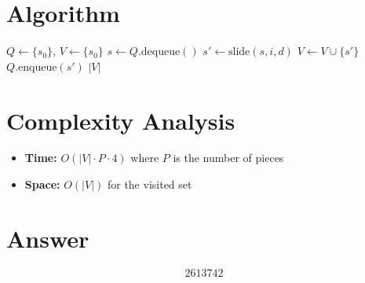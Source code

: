 \documentclass[12pt]{article}
\begin{document}
\section{Algorithm}
\begin{algorithm}[H]
\caption{BFS for Reachable Configurations}
\begin{algorithmic}[1]
\State $Q \gets \{s_0\}$, $V \gets \{s_0\}$
    \State $s \gets Q.\text{dequeue}()$
            \State $s' \gets \text{slide}(s, i, d)$
                \State $V \gets V \cup \{s'\}$
                \State $Q.\text{enqueue}(s')$
            \EndIf
        \EndFor
    \EndFor
\EndWhile
\State \Return $|V|$
\end{algorithmic}
\end{algorithm}

\section{Complexity Analysis}
\begin{itemize}
    \item \textbf{Time:} $O(|V| \cdot P \cdot 4)$ where $P$ is the number of pieces
    \item \textbf{Space:} $O(|V|)$ for the visited set
\end{itemize}

\section{Answer}

\[
\boxed{2613742}
\]
\end{document}
